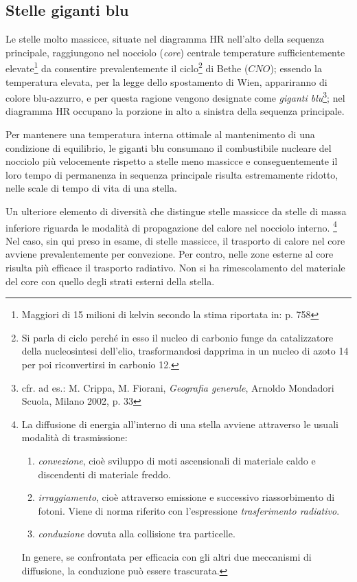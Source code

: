 \subsection{Stelle giganti blu}\label{giganti blu}
Le stelle molto massicce, situate nel diagramma HR nell'alto della sequenza principale, raggiungono nel nocciolo (\emph{core}) centrale temperature sufficientemente elevate\footnote{Maggiori di 15 milioni di kelvin secondo la stima riportata in: \Cite{rosino} p. 758} da consentire prevalentemente il ciclo\footnote{Si parla di ciclo perch\'{e} in esso il nucleo di carbonio funge da catalizzatore della nucleosintesi dell'elio, trasformandosi dapprima in un nucleo di azoto 14 per poi riconvertirsi in carbonio 12.} di Bethe ($CNO$); essendo la temperatura elevata, per la legge dello spostamento di Wien, appariranno di colore blu-azzurro, e per questa ragione vengono designate come \emph{giganti blu}\footnote{cfr. ad es.: M. Crippa, M. Fiorani, \emph{Geografia generale}, Arnoldo Mondadori Scuola, Milano 2002, p. 33}; nel diagramma HR occupano la porzione in alto a sinistra della sequenza principale.
\par
Per mantenere una temperatura interna ottimale al mantenimento di una condizione di equilibrio, le giganti blu consumano il combustibile nucleare del nocciolo più velocemente rispetto a stelle meno massicce e conseguentemente il loro tempo di permanenza in sequenza principale risulta estremamente ridotto, nelle scale di tempo di vita di una stella.
\par
Un ulteriore elemento di diversit\`{a} che distingue stelle massicce da stelle di massa inferiore riguarda le modalit\`{a} di propagazione del calore nel nocciolo interno.
\footnote{La diffusione di energia all'interno di una stella avviene attraverso le usuali modalit\`{a} di trasmissione:
\begin{enumerate}
\item
\emph{convezione}, cioè sviluppo di moti ascensionali di materiale caldo e discendenti di materiale freddo.
\item
\emph{irraggiamento}, cioè attraverso emissione e successivo riassorbimento di fotoni. Viene di norma riferito con l'espressione \emph{trasferimento radiativo}.
\item
\emph{conduzione} dovuta alla collisione tra particelle.
\end{enumerate}
In genere, se confrontata per efficacia con gli altri due meccanismi di diffusione, la conduzione può essere trascurata.}
Nel caso, sin qui preso in esame, di stelle massicce, il trasporto di calore nel core avviene prevalentemente per convezione. Per contro, nelle zone esterne al core risulta più efficace il trasporto radiativo.
Non si ha rimescolamento del materiale del core con quello degli strati esterni della stella.
